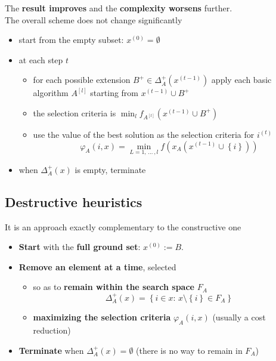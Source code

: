 \documentclass[11pt]{article}
\begin{document}
	The \textbf{result improves} and the \textbf{complexity worsens} further.\\
	
	The overall scheme does not change significantly
	\begin{itemize}
		\item start from the empty subset: $x^{(0)} = \emptyset$
		
		\item at each step $t$
		\begin{itemize}
			\item for each possible extension $B^+ \in \Delta_A^+ (x^{(t−1)})$ apply each basic algorithm $A^{[l]}$ starting from $x^{(t−1)} \cup B^+$
			
			\item the selection criteria is $\min_l f_{A^{[l]}} (x^{(t−1)} \cup B^+)$
			
			\item use the value of the best solution as the selection criteria for $i^{(t)}$
			$$ \varphi_A (i,x) = \min_{L = 1, \, ... \, , l} f \left(x_A \left(x^{(t-1)} \cup \left\{i\right\} \right) \right) $$
		\end{itemize}
		\item when $\Delta_A^+ (x)$ is empty, terminate
	\end{itemize}
	
	\newpage
	
	\subsection{Destructive heuristics}
	It is an approach exactly complementary to the constructive one
	\begin{itemize}
		\item \textbf{Start} with the \textbf{full ground set}: $x^{(0)} := B$.\\
		
		\item \textbf{Remove an element at a time}, selected 
		\begin{itemize}
			\item so as to \textbf{remain within the search space} $F_A$
			$$ \Delta_A^+ (x) = \left\{i \in x : \, x \setminus \left\{i\right\} \in F_A \right\} $$
			
			\item \textbf{maximizing the selection criteria} $\varphi_A (i, x)$ (usually a cost reduction)
		\end{itemize}
		\nn
		
		\item \textbf{Terminate} when $\Delta_A^+ (x) = \emptyset$ (there is no way to remain in $F_A$)
	\end{itemize}
	
\end{document}
